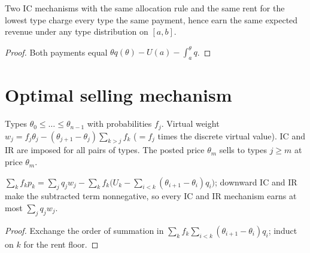 \begin{theorem}
\label{thm:revenue-equivalence}
\leanok
{}
Two IC mechanisms with the same allocation rule and the same rent for the lowest type charge every type
the same payment, hence earn the same expected revenue under any type distribution on $[a,b]$.
\end{theorem}
\begin{proof}
\leanok
Both payments equal $\theta q(\theta) - U(a) - \int_a^\theta q$.
\end{proof}

\section{Optimal selling mechanism}
\label{sec:optimal-mechanism}

\begin{definition}
\label{def:virtual-weight}
\leanok
Types $\theta_0 \le \dots \le \theta_{n-1}$ with probabilities $f_j$. Virtual weight
$w_j = f_j\theta_j - (\theta_{j+1}-\theta_j)\sum_{k>j} f_k$ ($= f_j$ times the discrete virtual value).
IC and IR are imposed for all pairs of types. The posted price $\theta_m$ sells to types $j \ge m$ at price $\theta_m$.
\end{definition}

\begin{theorem}
\label{thm:myerson-bound}
\leanok
{}
$\sum_k f_k p_k = \sum_j q_j w_j - \sum_k f_k\bigl(U_k - \sum_{i<k}(\theta_{i+1}-\theta_i)q_i\bigr)$; downward IC and IR
make the subtracted term nonnegative, so every IC and IR mechanism earns at most $\sum_j q_j w_j$.
\end{theorem}
\begin{proof}
\leanok
Exchange the order of summation in $\sum_k f_k \sum_{i<k}(\theta_{i+1}-\theta_i)q_i$; induct on $k$ for the rent floor.
\end{proof}

